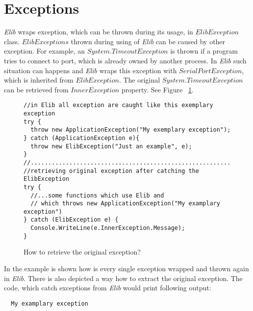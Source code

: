 \chapter*{Exceptions}
  {\it Elib} wraps exception, which can be thrown during its usage, in $ ElibException$ class.
  $ElibExceptions$ thrown during using of {\it Elib} can be caused by other exception.
  For example, an $System.TimeoutException$ is thrown if a program tries to connect to port, 
  which is already owned by another process.
  In {\it Elib} such situation can happens and {\it Elib} wraps this exception
  with $SerialPortException$, which is inherited from $ElibException$.
  The original $System.TimeoutException$ can be retrieved from $InnerException$ property.
  See Figure ~\ref{exceptionuse}.
\begin{figure}[!hbp]
\begin{lstlisting}
//in Elib all exception are caught like this exemplary exception
try {
  throw new ApplicationException("My exemplary exception");
} catch (ApplicationException e){
  throw new ElibException("Just an example", e);
}
//........................................................................
//retrieving original exception after catching the ElibException
try {
  //...some functions which use Elib and 
  // which throws new ApplicationException("My examplary exception")
} catch (ElibException e) {
  Console.WriteLine(e.InnerException.Message);
}
\end{lstlisting}
\caption{How to retrieve the original exception?}
\label{exceptionuse}
\end{figure}
  In the example is shown how is every single exception wrapped and thrown again in {\it Elib}.
  There is also depicted a way how to extract the original exception.
  The code, which catch exceptions from {\it Elib} would print following output:
\begin{verbatim}
  My examplary exception
\end{verbatim}

